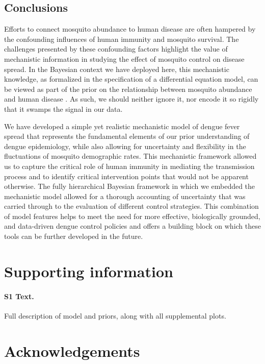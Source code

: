 \documentclass[10pt,letterpaper]{article}
\begin{document}
\subsection*{Conclusions}

Efforts to connect mosquito abundance to human disease are often hampered by the confounding influences of human immunity and mosquito survival.
The challenges presented by these confounding factors highlight the value of mechanistic information in studying the effect of mosquito control on disease spread.
In the Bayesian context we have deployed here, this mechanistic knowledge, as formalized in the specification of a differential equation model, can be viewed as part of the prior on the relationship between mosquito abundance and human disease \cite{Ellner1998, Wikle2010}.
As such, we should neither ignore it, nor encode it so rigidly that it swamps the signal in our data.

We have developed a simple yet realistic mechanistic model of dengue fever spread that represents the fundamental elements of our prior understanding of dengue epidemiology, while also allowing for uncertainty and flexibility in the fluctuations of mosquito demographic rates.
This mechanistic framework allowed us to capture the critical role of human immunity in mediating the transmission process and to identify critical intervention points that would not be apparent otherwise.
The fully hierarchical Bayesian framework in which we embedded the mechanistic model allowed for a thorough accounting of uncertainty that was carried through to the evaluation of different control strategies.
This combination of model features helps to meet the need for more effective, biologically grounded, and data-driven dengue control policies and offers a building block on which these tools can be further developed in the future.

\section*{Supporting information}

\paragraph*{S1 Text.}
\label{S1}
{Full description of model and priors, along with all supplemental plots.}

\section*{Acknowledgements}
\end{document}
